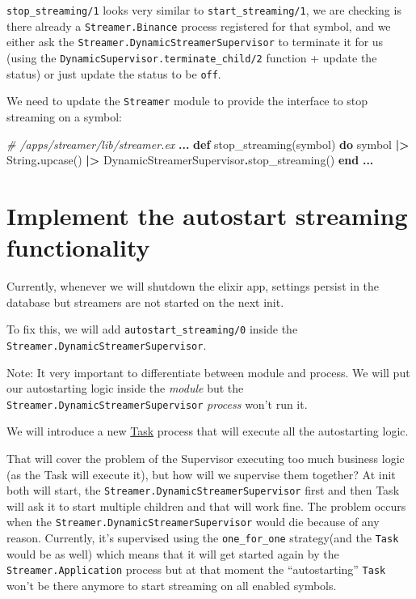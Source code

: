 \documentclass[
  oneside]{book}
\newenvironment{Shaded}{\begin{snugshade}}{\end{snugshade}}
\newcommand{\CommentTok}[1]{\textcolor[rgb]{0.56,0.35,0.01}{\textit{#1}}}
\newcommand{\ConstantTok}[1]{\textcolor[rgb]{0.00,0.00,0.00}{#1}}
\newcommand{\KeywordTok}[1]{\textcolor[rgb]{0.13,0.29,0.53}{\textbf{#1}}}
\newcommand{\NormalTok}[1]{#1}
\newcommand{\OperatorTok}[1]{\textcolor[rgb]{0.81,0.36,0.00}{\textbf{#1}}}
\begin{document}
\texttt{stop\_streaming/1} looks very similar to \texttt{start\_streaming/1}, we are checking is there already a \texttt{Streamer.Binance} process registered for that symbol, and we either ask the \texttt{Streamer.DynamicStreamerSupervisor} to terminate it for us (using the \texttt{DynamicSupervisor.terminate\_child/2} function + update the status) or just update the status to be \texttt{off}.

We need to update the \texttt{Streamer} module to provide the interface to stop streaming on a symbol:

\begin{Shaded}
\begin{Highlighting}[]
\CommentTok{\# /apps/streamer/lib/streamer.ex}
  \OperatorTok{...}
  \KeywordTok{def}\NormalTok{ stop\_streaming(symbol) }\KeywordTok{do}
\NormalTok{    symbol}
    \OperatorTok{|\textgreater{}} \ConstantTok{String}\OperatorTok{.}\NormalTok{upcase()}
    \OperatorTok{|\textgreater{}} \ConstantTok{DynamicStreamerSupervisor}\OperatorTok{.}\NormalTok{stop\_streaming()}
  \KeywordTok{end}
  \OperatorTok{...}
\end{Highlighting}
\end{Shaded}

\hypertarget{implement-the-autostart-streaming-functionality}{%
\section{Implement the autostart streaming functionality}\label{implement-the-autostart-streaming-functionality}}

Currently, whenever we will shutdown the elixir app, settings persist in the database but streamers are not started on the next init.

To fix this, we will add \texttt{autostart\_streaming/0} inside the \texttt{Streamer.DynamicStreamerSupervisor}.

Note: It very important to differentiate between module and process. We will put our autostarting logic inside the \emph{module} but the \texttt{Streamer.DynamicStreamerSupervisor} \emph{process} won't run it.

We will introduce a new \href{https://hexdocs.pm/elixir/master/Task.html}{Task} process that will execute all the autostarting logic.

That will cover the problem of the Supervisor executing too much business logic (as the Task will execute it), but how will we supervise them together?
At init both will start, the \texttt{Streamer.DynamicStreamerSupervisor} first and then Task will ask it to start multiple children and that will work fine. The problem occurs when the \texttt{Streamer.DynamicStreamerSupervisor} would die because of any reason. Currently, it's supervised using the \texttt{one\_for\_one} strategy(and the \texttt{Task} would be as well) which means that it will get started again by the \texttt{Streamer.Application} process but at that moment the ``autostarting'' \texttt{Task} won't be there anymore to start streaming on all enabled symbols.
\end{document}
